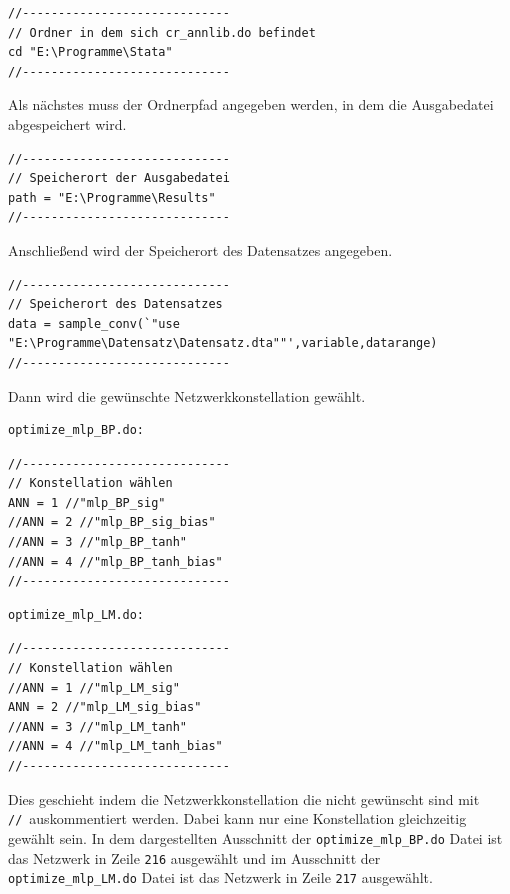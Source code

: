 {
\begin{lstlisting}[firstnumber=4]
//-----------------------------
// Ordner in dem sich cr_annlib.do befindet
cd "E:\Programme\Stata"
//-----------------------------
\end{lstlisting}
}

\newpage
Als nächstes muss der Ordnerpfad angegeben werden, in dem die Ausgabedatei abgespeichert wird. 


{
\begin{lstlisting}[firstnumber=225]
//-----------------------------
// Speicherort der Ausgabedatei
path = "E:\Programme\Results"
//-----------------------------
\end{lstlisting}
}

Anschließend wird der Speicherort des Datensatzes angegeben.

{
\begin{lstlisting}[firstnumber=257]
//-----------------------------
// Speicherort des Datensatzes
data = sample_conv(`"use "E:\Programme\Datensatz\Datensatz.dta""',variable,datarange)
//-----------------------------
\end{lstlisting}
}

Dann wird die gewünschte Netzwerkkonstellation gewählt.
\begin{Verbatim}
optimize_mlp_BP.do:
\end{Verbatim}
{
\begin{lstlisting}[firstnumber=214]
//-----------------------------
// Konstellation wählen
ANN = 1 //"mlp_BP_sig"
//ANN = 2 //"mlp_BP_sig_bias"
//ANN = 3 //"mlp_BP_tanh"
//ANN = 4 //"mlp_BP_tanh_bias"
//-----------------------------
\end{lstlisting}
}

\begin{Verbatim}
optimize_mlp_LM.do:
\end{Verbatim}
{
\begin{lstlisting}[firstnumber=214]
//-----------------------------
// Konstellation wählen
//ANN = 1 //"mlp_LM_sig"
ANN = 2 //"mlp_LM_sig_bias"
//ANN = 3 //"mlp_LM_tanh"
//ANN = 4 //"mlp_LM_tanh_bias"
//-----------------------------
\end{lstlisting}
}

Dies geschieht indem die Netzwerkkonstellation die nicht gewünscht sind mit \glqq \verb|//|\grqq~auskommentiert werden. Dabei kann nur eine Konstellation gleichzeitig gewählt sein. In dem dargestellten Ausschnitt der \verb|optimize_mlp_BP.do| Datei ist das Netzwerk in Zeile \verb|216| ausgewählt und im Ausschnitt der \verb|optimize_mlp_LM.do| Datei ist das Netzwerk in Zeile \verb|217| ausgewählt.


